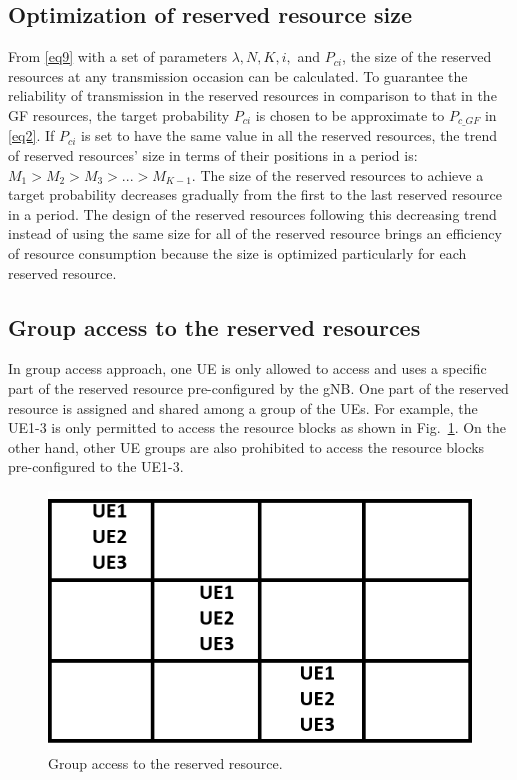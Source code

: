 \documentclass[conference]{IEEEtran}
\begin{document}
\subsection{Optimization of reserved resource size}\label{IIDD}
From \eqref{eq9} with a set of parameters  $\lambda, N, K, i,$ and $P_{ci}$, the size of the reserved resources at any transmission occasion can be calculated. To guarantee the reliability of transmission in the reserved resources in comparison to that in the GF resources, the target probability $P_{ci}$ is chosen to be approximate to $P_{c\_GF}$ in \eqref{eq2}. If $P_{ci}$ is set to have the same value in all the reserved resources, the trend of reserved resources' size in terms of their positions in a period is: $M_1 > M_2 > M_3 > ... > M_{K-1}$. The size of the reserved resources to achieve a target probability decreases gradually from the first to the last reserved resource in a period. The design of the reserved resources following this decreasing trend instead of using the same size for all of the reserved resource brings an efficiency of resource consumption because the size is optimized particularly for each reserved resource.

\subsection{Group access to the reserved resources}\label{IIEE}
In group access approach, one UE is only allowed to access and uses a specific part of the reserved resource pre-configured by the gNB. One part of the reserved resource is assigned and shared among a group of the UEs. For example, the UE1-3 is only permitted to access the resource blocks as shown in Fig.~\ref{fig4}. On the other hand, other UE groups are also prohibited to access the resource blocks pre-configured to the UE1-3. 

\begin{figure}[htbp]
\centerline{\includegraphics[scale=0.35]{fig4.png}}
\caption{Group access to the reserved resource.}
\label{fig4}
\vspace{-2mm}
\end{figure}
\end{document}
